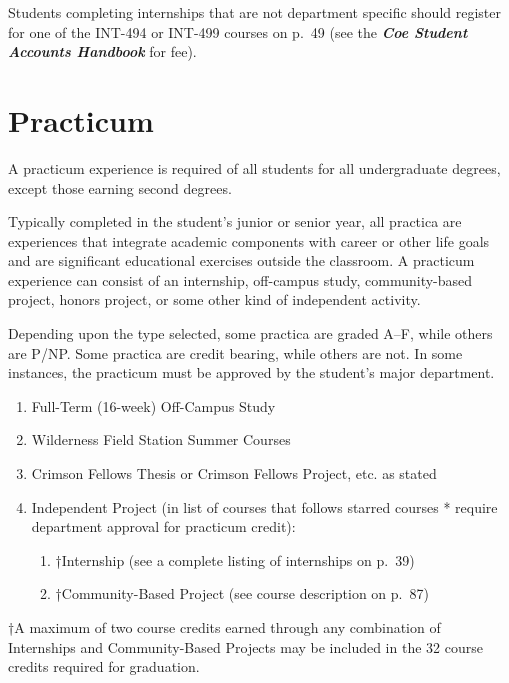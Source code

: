 \documentclass[
  letterpaper,
]{scrbook}
\providecommand{\tightlist}{%
  \setlength{\itemsep}{0pt}\setlength{\parskip}{0pt}}
\begin{document}
Students completing internships that are not department specific should
register for one of the INT-494 or INT-499 courses on p.~49 (see the
\textbf{\emph{Coe Student Accounts Handbook}} for fee).

\section{Practicum}\label{sec-practicum}

A practicum experience is required of all students for all undergraduate
degrees, except those earning second degrees.

Typically completed in the student's junior or senior year, all practica
are experiences that integrate academic components with career or other
life goals and are significant educational exercises outside the
classroom. A practicum experience can consist of an internship,
off-campus study, community-based project, honors project, or some other
kind of independent activity.

Depending upon the type selected, some practica are graded A--F, while
others are P/NP. Some practica are credit bearing, while others are not.
In some instances, the practicum must be approved by the student's major
department.

\begin{enumerate}
\def\labelenumi{\arabic{enumi}.}
\tightlist
\item
  Full-Term (16-week) Off-Campus Study
\item
  Wilderness Field Station Summer Courses
\item
  Crimson Fellows Thesis or Crimson Fellows Project, etc. as stated
\item
  Independent Project (in list of courses that follows starred courses *
  require department approval for practicum credit):

  \begin{enumerate}
  \def\labelenumii{\arabic{enumii}.}
  \setcounter{enumii}{4}
  \tightlist
  \item
    †Internship (see a complete listing of internships on p.~39)
  \item
    †Community-Based Project (see course description on p.~87)
  \end{enumerate}
\end{enumerate}

†A maximum of two course credits earned through any combination of
Internships and Community-Based Projects may be included in the 32
course credits required for graduation.
\end{document}
